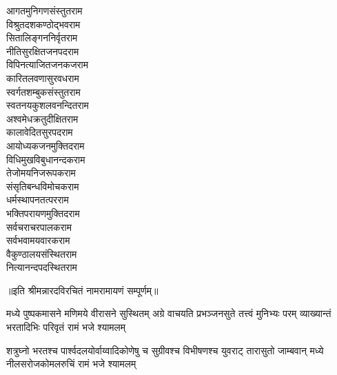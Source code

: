 \begin{large}
\begin{multicols}{2}
आगतमुनिगणसंस्तुत\hfill राम\\
विश्रुतदशकण्ठोद्भव\hfill राम\\
सितालिङ्गननिर्वृत\hfill राम\\
नीतिसुरक्षितजनपद\hfill राम\\
विपिनत्याजितजनकज\hfill राम\\
कारितलवणासुरवध\hfill राम\\
स्वर्गतशम्बुकसंस्तुत\hfill राम\\
स्वतनयकुशलवनन्दित\hfill राम\\
अश्वमेधक्रतुदीक्षित\hfill राम\\
कालावेदितसुरपद\hfill राम\\
आयोध्यकजनमुक्तिद\hfill राम\\
विधिमुखविबुधानन्दक\hfill राम\\
तेजोमयनिजरूपक\hfill राम\\
संसृतिबन्धविमोचक\hfill राम\\
धर्मस्थापनतत्पर\hfill राम\\
भक्तिपरायणमुक्तिद\hfill राम\\
सर्वचराचरपालक\hfill राम\\
सर्वभवामयवारक\hfill राम\\
वैकुण्ठालयसंस्थित\hfill राम\\
नित्यानन्दपदस्थित\hfill राम\\
\jaya
\end{multicols}
\vspace{-0.5cm}
॥इति श्रीमन्नारदविरचितं नामरामायणं सम्पूर्णम्॥
\end{large}

\closesection 

{मध्ये पुष्पकमासने मणिमये वीरासने सुस्थितम्}
{अग्रे वाचयति प्रभञ्जनसुते तत्त्वं मुनिभ्यः परम्}
{व्याख्यान्तं भरतादिभिः परिवृतं रामं भजे श्यामलम्}

{शत्रुघ्नो भरतश्च पार्श्वदलयोर्वाय्वादिकोणेषु च}
{सुग्रीवश्च विभीषणश्च युवराट् तारासुतो जाम्बवान्}
{मध्ये नीलसरोजकोमलरुचिं रामं भजे श्यामलम्}
